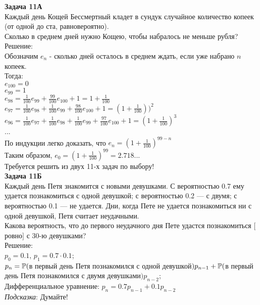 \documentclass[pdftex,12pt,a4paper]{article}
\begin{document}
\textbf{Задача 11А} \\
Каждый день Кощей Бессмертный кладет в сундук случайное количество
копеек (от одной до ста, равновероятно). \\
Сколько в среднем дней нужно Кощею, чтобы набралось не меньше рубля? \\
Решение: \\
Обозначим $e_{n}$ - сколько дней осталось в среднем ждать, если
уже набрано $n$ копеек. \\
Тогда: \\
$e_{100}=0$ \\
$e_{99}=1$ \\
$e_{98}=\frac{1}{100}e_{99}+\frac{99}{100}e_{100}+1=1+\frac{1}{100}$\\
$e_{97}=\frac{1}{100}e_{98}+\frac{1}{100}e_{99}+\frac{98}{100}e_{100}+1=(1+\frac{1}{100}))^{2}$
\\
$e_{96}=\frac{1}{100}e_{97}+\frac{1}{100}e_{98}+\frac{1}{100}e_{99}+\frac{97}{100}e_{100}+1=(1+\frac{1}{100})^{3}$
\\
... \\
По индукции легко доказать, что $e_{n}=(1+\frac{1}{100})^{99-n}$ \\
Таким образом, $e_{0}=(1+\frac{1}{100})^{99}=2.718...$ \\

Требуется решить \textbf{} из двух 11-х задач по
выбору! \\



\textbf{Задача 11Б} \\
Каждый день Петя знакомится с новыми девушками. С вероятностью 0.7
ему удается познакомиться с одной девушкой; с вероятностью 0.2 --- с
двумя; с вероятностью 0.1 --- не удается. Дни, когда Пете не удается
познакомиться ни с одной девушкой, Петя считает неудачными. \\
Какова вероятность, что до первого неудачного дня Пете удастся
познакомиться $[$ровно$]$ с 30-ю девушками? \\
Решение: \\
$p_{0}=0.1$, $p_{1}=0.7\cdot 0.1$; \\
$p_{n}=\P($в первый день Петя познакомился с одной
девушкой$)p_{n-1}+\P($в первый день Петя познакомился с двумя
девушками$)p_{n-2}$; \\
Дифференциальное уравнение: $p_{n}=0.7p_{n-1}+0.1p_{n-2}$ \\


\emph{Подсказка}: Думайте! \\
\end{document}
